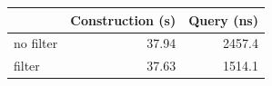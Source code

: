 \begin{tabular}{lrr}
 & Construction (s) & Query (ns) \\
\hline
no filter & 37.94 & 2457.4 \\
filter & 37.63 & 1514.1 \\
\end{tabular}
